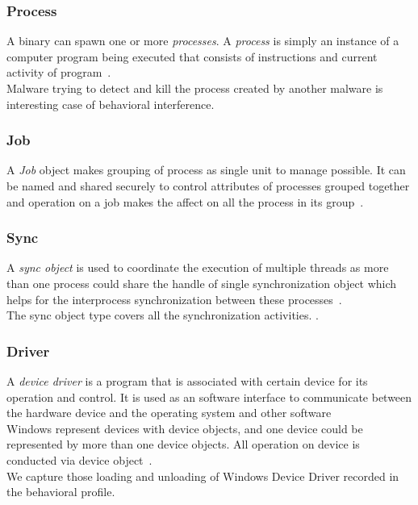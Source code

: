 \subsubsection{Process}
\label{ssub:Process}
A binary can spawn one or more \emph{processes}.
A \emph{process} is simply an instance of a computer program being executed that consists of instructions and current activity of program~\cite[]{msprocess}.\\
Malware trying to detect and kill the process created by another malware is interesting case of behavioral interference.
\subsubsection{Job}
\label{ssub:Job}
A \emph{Job} object makes grouping of process as single unit to manage possible.
It can be named and shared securely to control attributes of processes grouped together and operation on a job makes the affect on all the process in its group~\cite[]{msjob}.
\subsubsection{Sync}
\label{ssub:Sync}
A \emph{sync object} is used to coordinate the execution of multiple threads as more than one process could share the handle of single synchronization object which helps for the interprocess synchronization between these processes~\cite[]{mssync}.\\
The sync object type covers all the synchronization activities.
\cite[]{mssync}.
\subsubsection{Driver}
\label{ssub:Driver}
A \emph{device driver } is a program that is associated with certain device for its operation and control. It is used as an software interface to communicate between the hardware device and the operating system and other software~\cite[Device Driver]{devicedriver} \\
Windows represent devices with device objects, and one device could be represented by more than one device objects. All operation on device is conducted via device object~\cite[]{msdevice}.\\
We capture those loading and unloading of Windows Device Driver recorded in the behavioral profile.\\

